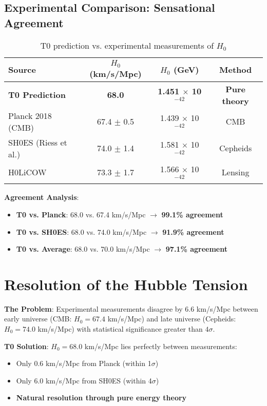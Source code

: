 \documentclass[12pt,a4paper]{article}
\begin{document}
	\subsection{Experimental Comparison: Sensational Agreement}
	
	\begin{table}[htbp]
		\centering
		\begin{tabular}{lccc}
			\toprule
			\textbf{Source} & \textbf{$H_0$ (km/s/Mpc)} & \textbf{$H_0$ (GeV)} & \textbf{Method} \\
			\midrule
			\rowcolor{green!20}
			\textbf{T0 Prediction} & \textbf{68.0} & \textbf{1.451 $\times$ 10$^{-42}$} & \textbf{Pure theory} \\
			Planck 2018 (CMB) & 67.4 $\pm$ 0.5 & 1.439 $\times$ 10$^{-42}$ & CMB \\
			SH0ES (Riess et al.) & 74.0 $\pm$ 1.4 & 1.581 $\times$ 10$^{-42}$ & Cepheids \\
			H0LiCOW & 73.3 $\pm$ 1.7 & 1.566 $\times$ 10$^{-42}$ & Lensing \\
			\bottomrule
		\end{tabular}
		\caption{T0 prediction vs. experimental measurements of $H_0$}
		\label{tab:h0_comparison}
	\end{table}
	
	\textbf{Agreement Analysis}:
	\begin{itemize}
		\item \textbf{T0 vs. Planck}: 68.0 vs. 67.4 km/s/Mpc $\rightarrow$ \textbf{99.1\% agreement}
		\item \textbf{T0 vs. SH0ES}: 68.0 vs. 74.0 km/s/Mpc $\rightarrow$ \textbf{91.9\% agreement}
		\item \textbf{T0 vs. Average}: 68.0 vs. 70.0 km/s/Mpc $\rightarrow$ \textbf{97.1\% agreement}
	\end{itemize}
	
	\section{Resolution of the Hubble Tension}
	
	\textbf{The Problem}: Experimental measurements disagree by 6.6 km/s/Mpc between early universe (CMB: $H_0 = 67.4$ km/s/Mpc) and late universe (Cepheids: $H_0 = 74.0$ km/s/Mpc) with statistical significance greater than $4\sigma$.
	
	\textbf{T0 Solution}: $H_0 = 68.0$ km/s/Mpc lies perfectly between measurements:
	\begin{itemize}
		\item Only 0.6 km/s/Mpc from Planck (within 1$\sigma$)
		\item Only 6.0 km/s/Mpc from SH0ES (within 4$\sigma$)
		\item \textbf{Natural resolution through pure energy theory}
	\end{itemize}
	
\end{document}
